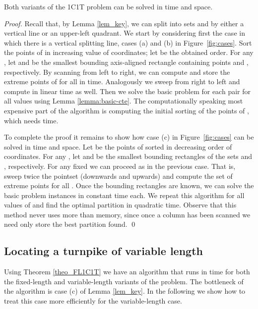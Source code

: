 \documentclass{llncs}
\begin{document}
\begin{theorem}\label{theo_FL1C1T}
Both variants of the 1C1T problem can be solved in  time and  space.
\end{theorem}
\begin{proof}
Recall that, by Lemma \ref{lem_key}, we can split  into sets  and  by either a  vertical line or an upper-left quadrant. We start by considering first the case in which there is a vertical splitting line, cases (a) and (b) in Figure~\ref{fig:cases}. Sort the points of  in increasing value of  coordinates; let  be the obtained order. For any , let  and  be the smallest bounding axis-aligned rectangle containing points  and , respectively. By scanning from left to right, we can compute and store the extreme points of  for all  in  time. Analogously we sweep from right to left and compute  in linear time as well. Then we solve the basic problem for each pair  for all values  using Lemma \ref{lemma:basic-cte}. The computationally speaking most expensive part of the algorithm is computing the initial sorting of the points of , which needs  time.

To complete the proof it remains to show how case (c)  in Figure~\ref{fig:cases} can be solved in  time and  space.
Let  be the points of  sorted in decreasing order of  coordinates. For any , let  and  be the smallest bounding rectangles of the sets  and , respectively. For any fixed  we can proceed as in the previous case. That is, sweep twice the pointset (downwards and upwards) and compute the set of extreme points  for all . Once the bounding rectangles are known, we can solve the  basic problem instances in constant time each. We repeat this algorithm for all values of  and find the optimal partition in quadratic time. Observe that this method never uses more than  memory, since once a column has been scanned we need only store the best partition found. \qed
\end{proof}

\subsection{Locating a turnpike of variable length}
Using Theorem \ref{theo_FL1C1T} we have an algorithm that runs in  time for both the fixed-length and variable-length variants of the problem. The bottleneck of the algorithm is case (c) of Lemma \ref{lem_key}. In the following we show how to treat this case more efficiently for the variable-length case.
\end{document}
